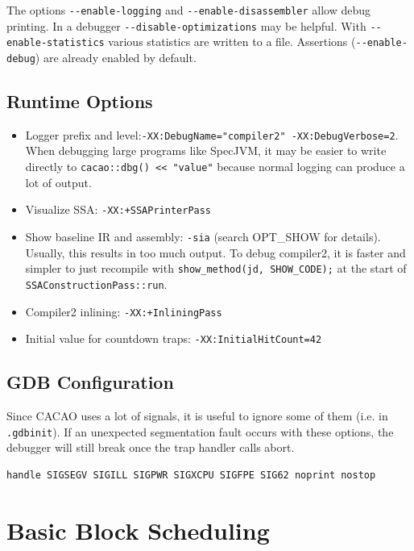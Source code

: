 \documentclass[draft,final]{vutinfth} %
\begin{document}
    The options \lstinline{--enable-logging} and \lstinline{--enable-disassembler} allow debug printing.
    In a debugger \lstinline{--disable-optimizations} may be helpful.
    With \lstinline{--enable-statistics} various statistics are written to a file.
    Assertions (\lstinline{--enable-debug}) are already enabled by default.

    \subsection{Runtime Options}

    \begin{itemize}
        \item Logger prefix and level:\lstinline{-XX:DebugName="compiler2" -XX:DebugVerbose=2}.
        When debugging large programs like SpecJVM, it may be easier to write directly to
        \lstinline{cacao::dbg() << "value"} because normal logging can produce a lot of output.
        \item Visualize SSA: \lstinline{-XX:+SSAPrinterPass}
        \item Show baseline IR and assembly: \lstinline{-sia} (search OPT\_SHOW for details).
        Usually, this results in too much output.
        To debug compiler2, it is faster and simpler to just recompile with
        \lstinline{show_method(jd, SHOW_CODE);} at the start of \lstinline{SSAConstructionPass::run}.
        \item Compiler2 inlining: \lstinline{-XX:+InliningPass}
        \item Initial value for countdown traps: \lstinline{-XX:InitialHitCount=42}
    \end{itemize}

    \subsection{GDB Configuration}

    Since CACAO uses a lot of signals, it is useful to ignore some of them (i.e. in \texttt{.gdbinit}).
    If an unexpected segmentation fault occurs with these options,
    the debugger will still break once the trap handler calls abort.
    \begin{verbatim}
handle SIGSEGV SIGILL SIGPWR SIGXCPU SIGFPE SIG62 noprint nostop
    \end{verbatim}


    \section{Basic Block Scheduling}
\end{document}
